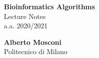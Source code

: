 \documentclass[12pt, letterpaper]{article}
\begin{document}
\begin{titlepage}
    \vspace*{2cm}
    \begin{center}
        \huge{\bfseries Bioinformatics Algorithms} \\[10pt]
        \Large{Lecture Notes} \\[10pt]
        \large{a.a. 2020/2021} \\
    \end{center}
    \vfill
    \begin{flushleft}        
        \large
        \textbf{Alberto Mosconi} \\
        \normalsize
        Politecnico di Milano
    \end{flushleft}
\end{titlepage}

\thispagestyle{empty}
\tableofcontents
\newpage

\setcounter{page}{1}





\end{document}
